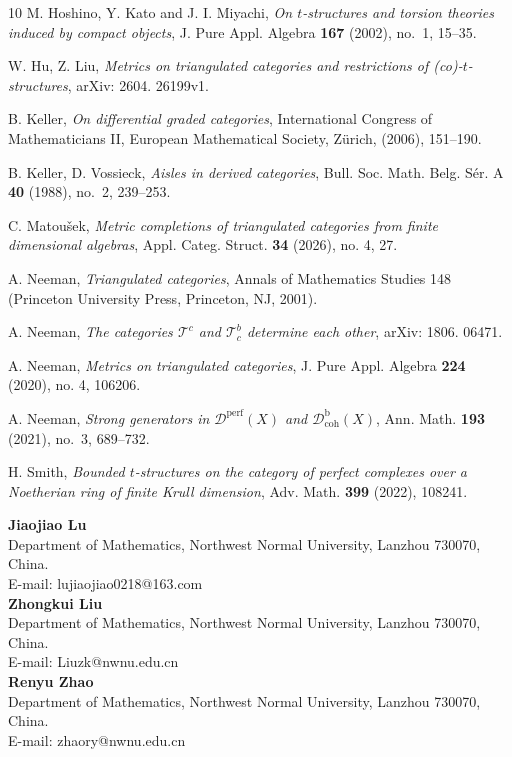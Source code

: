 \documentclass[11pt,a4paper]{amsart}
\numberwithin{equation}{section} \theoremstyle{plain}
\numberwithin{equation}{section} \theoremstyle{definition}
\begin{document}
\begin{thebibliography}{10}
M. Hoshino, Y. Kato and J. I. Miyachi, \emph{On $t$-structures and torsion theories induced by compact objects}, J. Pure Appl. Algebra \textbf{167} (2002), no.~1, 15--35.

W. Hu, Z. Liu, \emph{Metrics on triangulated categories and restrictions of (co)-$t$-structures}, arXiv: 2604. 26199v1.

B. Keller, \emph{On differential graded categories}, International Congress of Mathematicians II, European Mathematical Society, Z\"{u}rich, (2006), 151--190.

B. Keller, D. Vossieck, \emph{Aisles in derived categories}, Bull. Soc. Math. Belg. S\'{e}r. A  \textbf{40} (1988), no.~2, 239--253.

C. Matou\v{s}ek, \emph{Metric completions of triangulated categories from finite dimensional algebras}, Appl. Categ. Struct. \textbf{34} (2026), no. 4, 27.

A. Neeman, \emph{Triangulated categories}, Annals of Mathematics Studies 148 (Princeton University Press, Princeton, NJ, 2001).

A. Neeman, \emph{The categories $\mathcal{T}^{c}$ and $\mathcal{T}^{b}_{c}$ determine each other}, arXiv: 1806. 06471.

A. Neeman, \emph{Metrics on triangulated categories}, J. Pure Appl. Algebra \textbf{224} (2020), no. 4, 106206.

A. Neeman, \emph{Strong generators in $\mathscr{D}^{\mathrm{perf}}(X)$ and $\mathscr{D}_{\mathrm{coh}}^{\mathrm{b}}(X)$}, Ann. Math. \textbf{193} (2021), no.~3, 689--732.

H. Smith, \emph{Bounded $t$-structures on the category of perfect complexes over a Noetherian ring of finite Krull dimension}, Adv. Math. \textbf{399} (2022), 108241.


\end{thebibliography}
\textbf{Jiaojiao Lu}\\
Department of Mathematics, Northwest Normal University, Lanzhou 730070, China.\\
E-mail: \textsf{lujiaojiao0218@163.com}\\[1mm]
\textbf{Zhongkui Liu}\\
Department of Mathematics, Northwest Normal University, Lanzhou 730070, China.\\
E-mail: \textsf{Liuzk@nwnu.edu.cn}\\[1mm]
\textbf{Renyu Zhao}\\
Department of Mathematics, Northwest Normal University, Lanzhou 730070, China.\\
E-mail: \textsf{zhaory@nwnu.edu.cn}\\[1mm]
\end{document}
